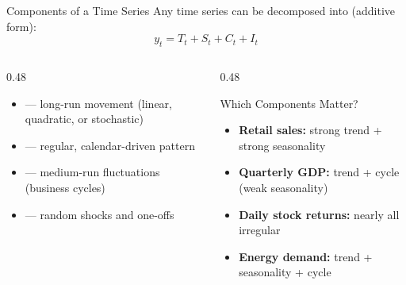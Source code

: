 \documentclass[aspectratio=169, 11pt]{beamer}
\begin{document}

\begin{frame}{Components of a Time Series}
  Any time series can be decomposed into (additive form):
  \[
    y_t = T_t + S_t + C_t + I_t
  \]
  \vspace{-6pt}
  \begin{columns}[T]
    \begin{column}{0.48\textwidth}
      \begin{itemize}
        \item {} --- long-run movement (linear, quadratic, or stochastic)
        \item {} --- regular, calendar-driven pattern
        \item {} --- medium-run fluctuations (business cycles)
        \item {} --- random shocks and one-offs
      \end{itemize}
    \end{column}
    \begin{column}{0.48\textwidth}
      \begin{examplebox}{Which Components Matter?}
        \begin{itemize}
          \item \textbf{Retail sales:} strong trend + strong seasonality
          \item \textbf{Quarterly GDP:} trend + cycle (weak seasonality)
          \item \textbf{Daily stock returns:} nearly all irregular
          \item \textbf{Energy demand:} trend + seasonality + cycle
        \end{itemize}
      \end{examplebox}
    \end{column}
  \end{columns}
\end{frame}
\end{document}
